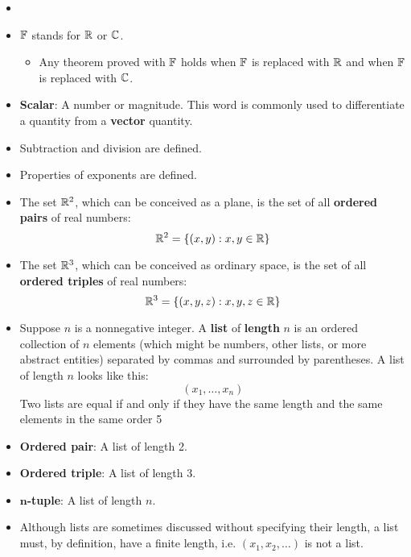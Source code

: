 \documentclass[../main.tex]{subfiles}
\begin{document}
\begin{itemize}
\begin{itemize}
    \end{itemize}
    \item {}
    \item $\mathbb{F}$ stands for $\mathbb{R}$ or $\mathbb{C}$.
    \begin{itemize}
        \item Any theorem proved with $\mathbb{F}$ holds when $\mathbb{F}$ is replaced with $\mathbb{R}$ and when $\mathbb{F}$ is replaced with $\mathbb{C}$.
    \end{itemize}
    \item \textbf{Scalar}: A number or magnitude. This word is commonly used to differentiate a quantity from a \textbf{vector} quantity.
    \item Subtraction and division are defined.
    \item Properties of exponents are defined.
    \item The set $\mathbb{R}^2$, which can be conceived as a plane, is the set of all \textbf{ordered pairs} of real numbers:
    \begin{equation*}
        \mathbb{R}^2 = \left\{ (x,y):x,y\in\mathbb{R} \right\}
    \end{equation*}
    \item The set $\mathbb{R}^3$, which can be conceived as ordinary space, is the set of all \textbf{ordered triples} of real numbers:
    \begin{equation*}
        \mathbb{R}^3 = \left\{ (x,y,z):x,y,z\in\mathbb{R} \right\}
    \end{equation*}
    \item \dq
        {Suppose $n$ is a nonnegative integer. A \textbf{list} of \textbf{length} $n$ is an ordered collection of $n$ elements (which might be numbers, other lists, or more abstract entities) separated by commas and surrounded by parentheses. A list of length $n$ looks like this:
        \begin{equation*}
            (x_1,\dots,x_n)
        \end{equation*}
        Two lists are equal if and only if they have the same length and the same elements in the same order}
    {5}
    \item \textbf{Ordered pair}: A list of length 2.
    \item \textbf{Ordered triple}: A list of length 3.
    \item \textbf{$\bm{n}$-tuple}: A list of length $n$.
    \item Although lists are sometimes discussed without specifying their length, a list must, by definition, have a finite length, i.e. $(x_1,x_2,\dots)$ is not a list.

\end{itemize}
\end{document}
